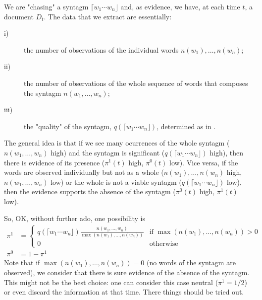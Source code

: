 \documentclass[10pt]{article}
\newcommand{\dqt}[1]        {"{#1}"}
\newcommand{\synt}[1]     {\lceil{#1}\rfloor}
\begin{document}
We are \dqt{chasing} a syntagm $\synt{w_1\cdots{w_n}}$ and, as
evidence, we have, at each time $t$, a document $D_t$. The data that
we extract are essentially:
%
\begin{description}
\item[i)] the number of observations of the individual words
  $n(w_1),\ldots,n(w_n)$;
\item[ii)] the number of observations of the whole sequence of words
  that composes the syntagm $n(w_1,\ldots,w_n)$;
\item[iii)] the \dqt{quality} of the syntagm,
  $q(\synt{w_1\cdots{w_n}})$, determined as in \cite{shang:2018}.
\end{description}

The general idea is that if we see many ocurrences of the whole
syntagm ($n(w_1,\ldots,w_n)$ high) and the syntagm is significant
($q(\synt{w_1\cdots{w_n}})$ high), then there is evidence of its
presence ($\pi^1(t)$ high, $\pi^0(t)$ low). Vice versa, if the words
are observed individually but not as a whole ($n(w_1),\ldots,n(w_n)$
high, $n(w_1,\ldots,w_n)$ low) or the whole is not a viable syntagm
($q(\synt{w_1\cdots{w_n}})$ low), then the evidence supports the
absence of the syntagm ($\pi^0(t)$ high, $\pi^1(t)$ low).

So, OK, without further ado, one possibility is
%
%
\begin{equation}
  \begin{aligned}
    \pi^1 &= \begin{cases}
      q(\synt{w_1\cdots{w_n}}) \frac{\displaystyle
        n(w_1,\ldots,w_n)}{\displaystyle \max(n(w_1),\ldots,n(w_n))} & \mbox{if $\max(n(w_1),\ldots,n(w_n))>0$} \\
      0 & \mbox{otherwise} 
      \end{cases} \\
    \pi^0 &= 1 - \pi^1
  \end{aligned}
\end{equation}
%
%
Note that if $\max(n(w_1),\ldots,n(w_n))=0$ (no words of the syntagm
are observed), we consider that there is sure evidence of the absence
of the syntagm. This might not be the best choice: one can consider
this case neutral ($\pi^1=1/2$) or even discard the information at
that time. There things should be tried out.
\end{document}

